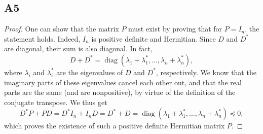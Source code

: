 \documentclass[11pt]{article}
\begin{document}
\subsection*{A5}
\begin{proof}
	One can show that the matrix \(P\) must exist by proving that for \(P = I_n\), the statement holds.
	Indeed, \(I_n\) is positive definite and Hermitian.
	Since \(D\) and \(D^*\) are diagonal, their sum is also diagonal.
	In fact,
	\[
	D + D^* = \mathop{\mathrm{diag}}(\lambda_1 + \lambda_1^*, \dots, \lambda_n + \lambda_n^*),
	\]
	where \(\lambda_i\) and \(\lambda_i^*\) are the eigenvalues of \(D\) and \(D^*\), respectively.
	We know that the imaginary parts of these eigenvalues cancel each other out, and that the real parts are the same (and are nonpositive), by virtue of the definition of the conjugate transpose.
	We thus get
	\[
	D^*P + PD = D^*I_n + I_nD = D^* + D = \mathop{\mathrm{diag}}(\lambda_1 + \lambda_1^*, \dots, \lambda_n + \lambda_n^*) \preceq 0,
	\]
	which proves the existence of such a positive definite Hermitian matrix \(P\).
\end{proof}
\end{document}
